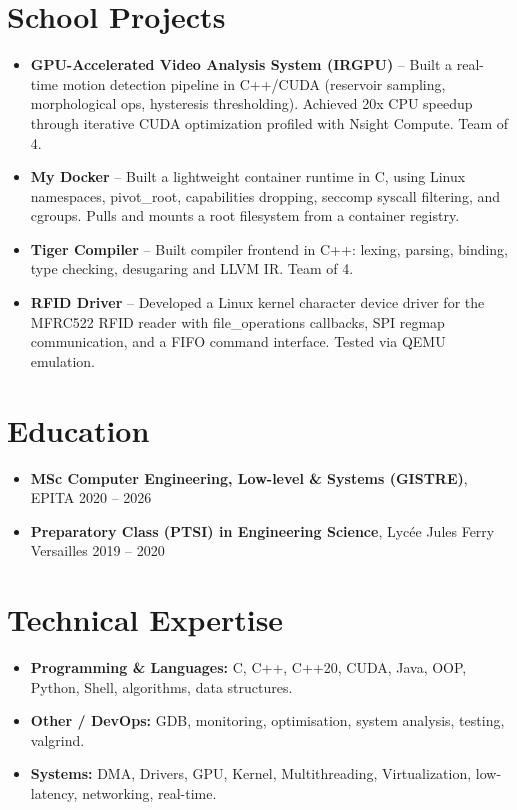\documentclass[9pt,a4paper]{article}
\begin{document}
\section*{School Projects}
\begin{tcolorbox}[mybox]
\begin{itemize}
\item \textbf{GPU-Accelerated Video Analysis System (IRGPU)} -- Built a real-time motion detection pipeline in C++/CUDA (reservoir sampling, morphological ops, hysteresis thresholding). Achieved 20x CPU speedup through iterative CUDA optimization profiled with Nsight Compute. Team of 4.

\item \textbf{My Docker} -- Built a lightweight container runtime in C, using Linux namespaces, pivot\_root, capabilities dropping, seccomp syscall filtering, and cgroups. Pulls and mounts a root filesystem from a container registry.

\item \textbf{Tiger Compiler} -- Built compiler frontend in C++: lexing, parsing, binding, type checking, desugaring and LLVM IR. Team of 4.

\item \textbf{RFID Driver} -- Developed a Linux kernel character device driver for the MFRC522 RFID reader with file\_operations callbacks, SPI regmap communication, and a FIFO command interface. Tested via QEMU emulation.
\end{itemize}
\end{tcolorbox}


\section*{Education}
\begin{tcolorbox}[mybox]
\begin{itemize}
\item \textbf{MSc Computer Engineering, Low-level \& Systems (GISTRE)}, EPITA {\small{\hfill 2020 – 2026}}

\item \textbf{Preparatory Class (PTSI) in Engineering Science}, Lycée Jules Ferry Versailles {\small{\hfill 2019 – 2020}}
\end{itemize}
\end{tcolorbox}


\section*{Technical Expertise}
\begin{tcolorbox}[mybox]
\begin{itemize}
\item \textbf{Programming \& Languages:} C, C++, C++20, CUDA, Java, OOP, Python, Shell, algorithms, data structures.

\item \textbf{Other / DevOps:} GDB, monitoring, optimisation, system analysis, testing, valgrind.

\item \textbf{Systems:} DMA, Drivers, GPU, Kernel, Multithreading, Virtualization, low-latency, networking, real-time.
\end{itemize}
\end{tcolorbox}
\end{document}
